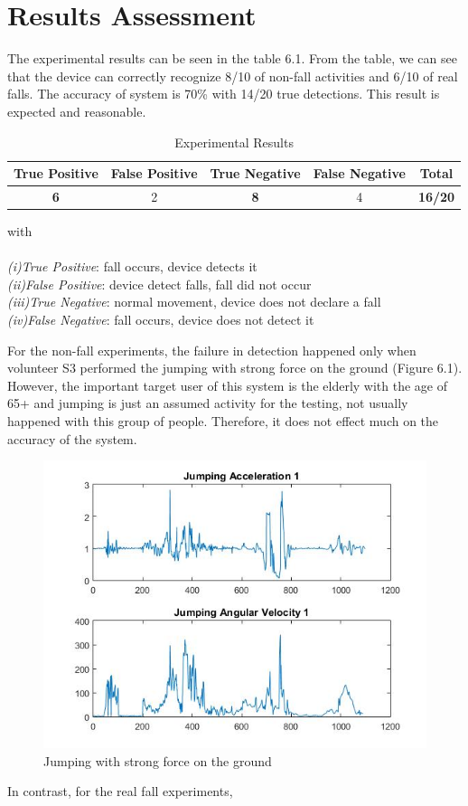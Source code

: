 \documentclass[letterpaper,12pt,titlepage,oneside,final]{book}
\begin{document}
\section{Results Assessment}
The experimental results can be seen in the table 6.1. From the table, we can see that the device can correctly recognize 8/10 of non-fall activities and 6/10 of real falls. The accuracy of system is 70\% with 14/20 true detections. This result is expected and reasonable. 
\begin{table}[h]
	\begin{center}
		\begin{tabular}{ |c|c|c|c|c| } 
			\hline
			True Positive & False Positive & True Negative & False Negative & Total\\
			\hline
			\textbf{6} & 2 & \textbf{8}& 4& \textbf{16/20}\\
			\hline
		\end{tabular}
		\caption{Experimental Results}
		\label{table:1}
	\end{center}
with\\
\\
	\textit{(i)True Positive}: fall occurs, device detects it\\
	\textit{(ii)False Positive}: device detect falls, fall did not occur\\
	\textit{(iii)True Negative}: normal movement, device does not declare a fall\\
	\textit{(iv)False Negative}: fall occurs, device does not detect it	\\
\end{table}\par

For the non-fall experiments, the failure in detection happened only when volunteer S3 performed the jumping with strong force on the ground (Figure 6.1). However, the important target user of this system is the elderly with the age of 65+ and jumping is just an assumed activity for the testing, not usually happened with this group of people. Therefore, it does not effect much on the accuracy of the system.
\clearpage
\begin{figure}[h!]
	\centering
	\includegraphics[scale=0.5]{jump_strong}
	\caption{Jumping with strong force on the ground}
\end{figure}
In contrast, for the real fall experiments, 
\end{document}
